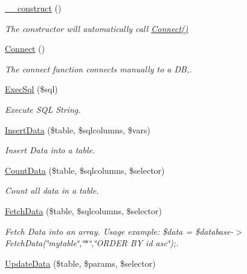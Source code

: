 \begin{DoxyCompactItemize}
\item 
\hyperlink{class_u_e4___d_b_handler_a095c5d389db211932136b53f25f39685}{\-\_\-\-\_\-construct} ()
\begin{DoxyCompactList}\small\item\em The constructor will automatically call \hyperlink{class_u_e4___d_b_handler_a9ac768272a054d6ef7e8436f1144b730}{Connect()} \end{DoxyCompactList}\item 
\hyperlink{class_u_e4___d_b_handler_a9ac768272a054d6ef7e8436f1144b730}{Connect} ()
\begin{DoxyCompactList}\small\item\em The connect function connects manually to a D\-B,. \end{DoxyCompactList}\item 
\hyperlink{class_u_e4___d_b_handler_aabe8429ec9577391e2ea244fe805c5ec}{Exec\-Sql} (\$sql)
\begin{DoxyCompactList}\small\item\em Execute S\-Q\-L String. \end{DoxyCompactList}\item 
\hyperlink{class_u_e4___d_b_handler_ab8ad12e8a3f2fed48c7e6974e58f6dcd}{Insert\-Data} (\$table, \$sqlcolumns, \$vars)
\begin{DoxyCompactList}\small\item\em Insert Data into a table. \end{DoxyCompactList}\item 
\hyperlink{class_u_e4___d_b_handler_a4c52087a53b72ebcc4b07961dadb908d}{Count\-Data} (\$table, \$sqlcolumns, \$selector)
\begin{DoxyCompactList}\small\item\em Count all data in a table. \end{DoxyCompactList}\item 
\hyperlink{class_u_e4___d_b_handler_a3858bee81ad39a80260c2fc0989ba358}{Fetch\-Data} (\$table, \$sqlcolumns, \$selector)
\begin{DoxyCompactList}\small\item\em Fetch Data into an array. Usage example\-: \$data = \$database-\/$>$Fetch\-Data(\char`\"{}mytable\char`\"{},\char`\"{}$\ast$\char`\"{},\char`\"{}\-O\-R\-D\-E\-R B\-Y id asc\char`\"{});. \end{DoxyCompactList}\item 
\hyperlink{class_u_e4___d_b_handler_a2b7783f4412697ee22ee576658082ff0}{Update\-Data} (\$table, \$params, \$selector)

\end{DoxyCompactItemize}
